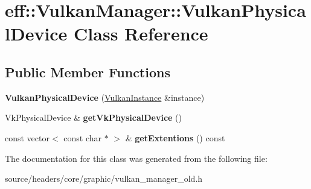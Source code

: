 \hypertarget{classeff_1_1VulkanManager_1_1VulkanPhysicalDevice}{}\section{eff\+:\+:Vulkan\+Manager\+:\+:Vulkan\+Physical\+Device Class Reference}
\label{classeff_1_1VulkanManager_1_1VulkanPhysicalDevice}
\subsection*{Public Member Functions}
\begin{DoxyCompactItemize}
\item 
\mbox{\label{classeff_1_1VulkanManager_1_1VulkanPhysicalDevice_a0bf9f64deb1c5922ab4004f540e14a22}} 
{\bfseries Vulkan\+Physical\+Device} (\mbox{\hyperlink{classeff_1_1VulkanManager_1_1VulkanInstance}{Vulkan\+Instance}} \&instance)
\item 
\mbox{\label{classeff_1_1VulkanManager_1_1VulkanPhysicalDevice_a3266787abffcfadfca93fe8781429e88}} 
Vk\+Physical\+Device \& {\bfseries get\+Vk\+Physical\+Device} ()
\item 
\mbox{\label{classeff_1_1VulkanManager_1_1VulkanPhysicalDevice_a90b91f4fe1cd8933124dc767cde09cf2}} 
const vector$<$ const char $\ast$ $>$ \& {\bfseries get\+Extentions} () const
\end{DoxyCompactItemize}


The documentation for this class was generated from the following file\+:\begin{DoxyCompactItemize}
\item 
source/headers/core/graphic/vulkan\+\_\+manager\+\_\+old.\+h\end{DoxyCompactItemize}
